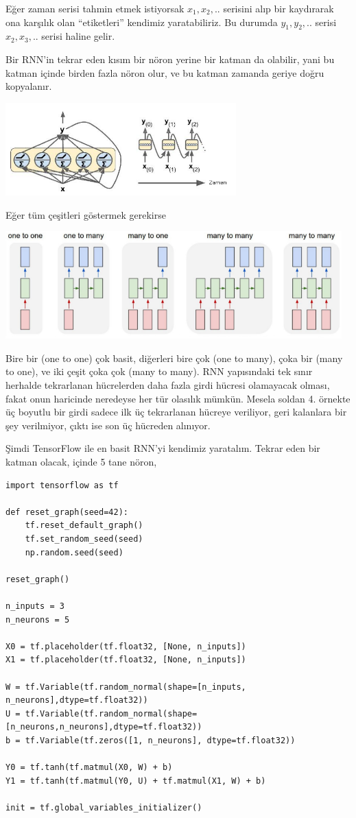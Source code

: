 \documentclass[12pt,fleqn]{article}\usepackage{../../common}
\begin{document}
Eğer zaman serisi tahmin etmek istiyorsak $x_1,x_2,..$ serisini alıp bir
kaydırarak ona karşılık olan ``etiketleri'' kendimiz yaratabiliriz. Bu
durumda $y_1,y_2,..$ serisi $x_2,x_3,..$ serisi haline gelir.

Bir RNN'in tekrar eden kısım bir nöron yerine bir katman da olabilir, yani
bu katman içinde birden fazla nöron olur, ve bu katman zamanda geriye doğru
kopyalanır. 

\includegraphics[width=24em]{rnn_06.png}

Eğer tüm çeşitleri göstermek gerekirse

\includegraphics[width=35em]{rnn_08.png}

Bire bir (one to one) çok basit, diğerleri bire çok (one to many), çoka bir
(many to one), ve iki çeşit çoka çok (many to many). RNN yapısındaki tek
sınır herhalde tekrarlanan hücrelerden daha fazla girdi hücresi olamayacak
olması, fakat onun haricinde neredeyse her tür olasılık mümkün. Mesela
soldan 4. örnekte üç boyutlu bir girdi sadece ilk üç tekrarlanan hücreye
veriliyor, geri kalanlara bir şey verilmiyor, çıktı ise son üç hücreden
alınıyor.

Şimdi TensorFlow ile en basit RNN'yi kendimiz yaratalım. Tekrar eden bir
katman olacak, içinde 5 tane nöron,

\begin{verbatim}
import tensorflow as tf

def reset_graph(seed=42):
    tf.reset_default_graph()
    tf.set_random_seed(seed)
    np.random.seed(seed)

reset_graph()

n_inputs = 3
n_neurons = 5

X0 = tf.placeholder(tf.float32, [None, n_inputs])
X1 = tf.placeholder(tf.float32, [None, n_inputs])

W = tf.Variable(tf.random_normal(shape=[n_inputs, n_neurons],dtype=tf.float32))
U = tf.Variable(tf.random_normal(shape=[n_neurons,n_neurons],dtype=tf.float32))
b = tf.Variable(tf.zeros([1, n_neurons], dtype=tf.float32))

Y0 = tf.tanh(tf.matmul(X0, W) + b)
Y1 = tf.tanh(tf.matmul(Y0, U) + tf.matmul(X1, W) + b)

init = tf.global_variables_initializer()
\end{verbatim}
\end{document}
